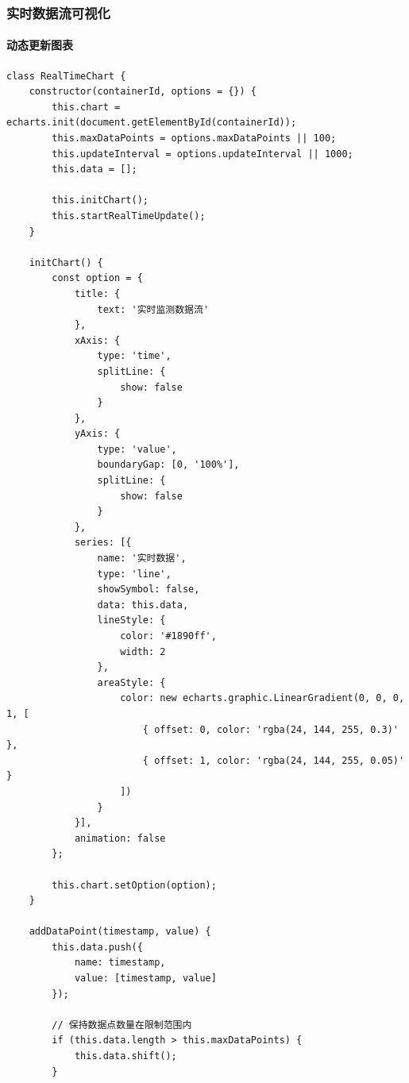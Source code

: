 \subsubsection{实时数据流可视化}\label{ux5b9eux65f6ux6570ux636eux6d41ux53efux89c6ux5316}

\paragraph{动态更新图表}\label{ux52a8ux6001ux66f4ux65b0ux56feux8868}

\begin{lstlisting}
class RealTimeChart {
    constructor(containerId, options = {}) {
        this.chart = echarts.init(document.getElementById(containerId));
        this.maxDataPoints = options.maxDataPoints || 100;
        this.updateInterval = options.updateInterval || 1000;
        this.data = [];
        
        this.initChart();
        this.startRealTimeUpdate();
    }
    
    initChart() {
        const option = {
            title: {
                text: '实时监测数据流'
            },
            xAxis: {
                type: 'time',
                splitLine: {
                    show: false
                }
            },
            yAxis: {
                type: 'value',
                boundaryGap: [0, '100%'],
                splitLine: {
                    show: false
                }
            },
            series: [{
                name: '实时数据',
                type: 'line',
                showSymbol: false,
                data: this.data,
                lineStyle: {
                    color: '#1890ff',
                    width: 2
                },
                areaStyle: {
                    color: new echarts.graphic.LinearGradient(0, 0, 0, 1, [
                        { offset: 0, color: 'rgba(24, 144, 255, 0.3)' },
                        { offset: 1, color: 'rgba(24, 144, 255, 0.05)' }
                    ])
                }
            }],
            animation: false
        };
        
        this.chart.setOption(option);
    }
    
    addDataPoint(timestamp, value) {
        this.data.push({
            name: timestamp,
            value: [timestamp, value]
        });
        
        // 保持数据点数量在限制范围内
        if (this.data.length > this.maxDataPoints) {
            this.data.shift();
        }
        

\end{lstlisting}
